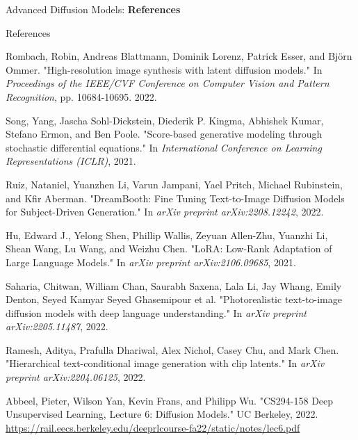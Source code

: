 \begin{frame}{}
    \LARGE Advanced Diffusion Models: \textbf{References}
\end{frame}

\begin{frame}[allowframebreaks]{References}
    
    \begin{thebibliography}{99}

    Rombach, Robin, Andreas Blattmann, Dominik Lorenz, Patrick Esser, and Björn Ommer. "High-resolution image synthesis with latent diffusion models." In \textit{Proceedings of the IEEE/CVF Conference on Computer Vision and Pattern Recognition}, pp. 10684-10695. 2022.

    Song, Yang, Jascha Sohl-Dickstein, Diederik P. Kingma, Abhishek Kumar, Stefano Ermon, and Ben Poole. "Score-based generative modeling through stochastic differential equations." In \textit{International Conference on Learning Representations (ICLR)}, 2021.

    Ruiz, Nataniel, Yuanzhen Li, Varun Jampani, Yael Pritch, Michael Rubinstein, and Kfir Aberman. "DreamBooth: Fine Tuning Text-to-Image Diffusion Models for Subject-Driven Generation." In \textit{arXiv preprint arXiv:2208.12242}, 2022.

    Hu, Edward J., Yelong Shen, Phillip Wallis, Zeyuan Allen-Zhu, Yuanzhi Li, Shean Wang, Lu Wang, and Weizhu Chen. "LoRA: Low-Rank Adaptation of Large Language Models." In \textit{arXiv preprint arXiv:2106.09685}, 2021.

    Saharia, Chitwan, William Chan, Saurabh Saxena, Lala Li, Jay Whang, Emily Denton, Seyed Kamyar Seyed Ghasemipour et al. "Photorealistic text-to-image diffusion models with deep language understanding." In \textit{arXiv preprint arXiv:2205.11487}, 2022.

    Ramesh, Aditya, Prafulla Dhariwal, Alex Nichol, Casey Chu, and Mark Chen. "Hierarchical text-conditional image generation with clip latents." In \textit{arXiv preprint arXiv:2204.06125}, 2022.

    Abbeel, Pieter, Wilson Yan, Kevin Frans, and Philipp Wu. "CS294-158 Deep Unsupervised Learning, Lecture 6: Diffusion Models." UC Berkeley, 2022. \url{https://rail.eecs.berkeley.edu/deeprlcourse-fa22/static/notes/lec6.pdf}

    \end{thebibliography}
\end{frame}